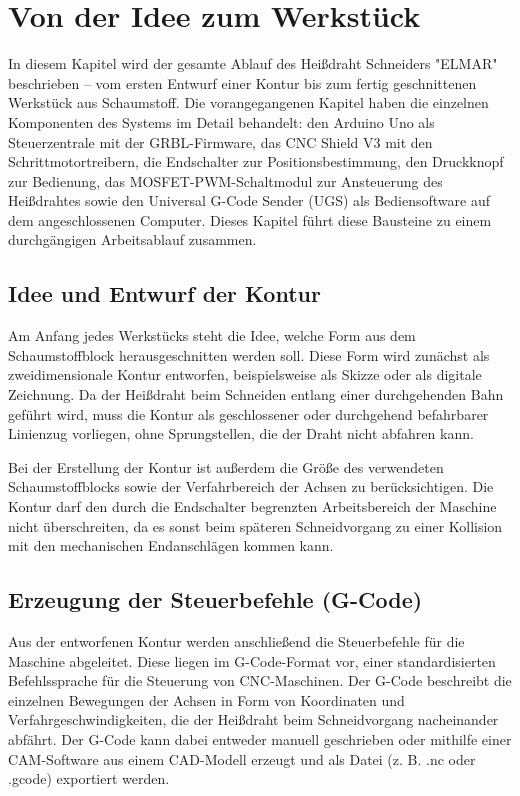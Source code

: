 \chapter{Von der Idee zum Werkstück}

In diesem Kapitel wird der gesamte Ablauf des Heißdraht Schneiders
"ELMAR" beschrieben -- vom ersten Entwurf einer Kontur bis zum fertig
geschnittenen Werkstück aus Schaumstoff. Die vorangegangenen Kapitel
haben die einzelnen Komponenten des Systems im Detail behandelt: den
Arduino Uno als Steuerzentrale mit der GRBL-Firmware, das CNC Shield V3
mit den Schrittmotortreibern, die Endschalter zur Positionsbestimmung,
den Druckknopf zur Bedienung, das MOSFET-PWM-Schaltmodul zur Ansteuerung
des Heißdrahtes sowie den Universal G-Code Sender (UGS) als
Bediensoftware auf dem angeschlossenen Computer. Dieses Kapitel führt
diese Bausteine zu einem durchgängigen Arbeitsablauf zusammen.

\section{Idee und Entwurf der Kontur}

Am Anfang jedes Werkstücks steht die Idee, welche Form aus dem
Schaumstoffblock herausgeschnitten werden soll. Diese Form wird zunächst
als zweidimensionale Kontur entworfen, beispielsweise als Skizze oder
als digitale Zeichnung. Da der Heißdraht beim Schneiden entlang einer
durchgehenden Bahn geführt wird, muss die Kontur als geschlossener oder
durchgehend befahrbarer Linienzug vorliegen, ohne Sprungstellen, die der
Draht nicht abfahren kann.

Bei der Erstellung der Kontur ist außerdem die Größe des verwendeten
Schaumstoffblocks sowie der Verfahrbereich der Achsen zu
berücksichtigen. Die Kontur darf den durch die Endschalter begrenzten
Arbeitsbereich der Maschine nicht überschreiten, da es sonst beim
späteren Schneidvorgang zu einer Kollision mit den mechanischen
Endanschlägen kommen kann.

\section{Erzeugung der Steuerbefehle (G-Code)}

Aus der entworfenen Kontur werden anschließend die Steuerbefehle für die
Maschine abgeleitet. Diese liegen im G-Code-Format vor, einer
standardisierten Befehlssprache für die Steuerung von CNC-Maschinen. Der
G-Code beschreibt die einzelnen Bewegungen der Achsen in Form von
Koordinaten und Verfahrgeschwindigkeiten, die der Heißdraht beim
Schneidvorgang nacheinander abfährt. Der G-Code kann dabei entweder
manuell geschrieben oder mithilfe einer CAM-Software aus einem
CAD-Modell erzeugt und als Datei (z. B. .nc oder .gcode) exportiert
werden.

